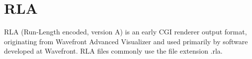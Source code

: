 \vspace{.25in}

\section{RLA}
\label{sec:bundledplugins:rla}

RLA (Run-Length encoded, version A) is an early CGI renderer output format,
originating from Wavefront Advanced Visualizer and used primarily by software
developed at Wavefront.  RLA files commonly use the file extension {\cf .rla}.

\vspace{.125in}

